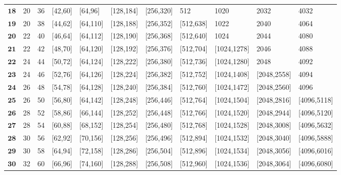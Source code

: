 \begin{sidewaystable}
\begin{tabular}{C{0.8cm}C{1.7cm}C{1.7cm}C{1.7cm}C{1.7cm}C{1.7cm}C{1.7cm}C{1.9cm}C{1.9cm}C{1.8cm}C{1.7cm}}
$\mathbf{18}$ & 20 & 36 & [42,60] & [64,96] & [128,184] & [256,320] & 512 & 1020 & 2032 & 4032 \\
$\mathbf{19}$ & 20 & 38 & [44,62] & [64,110] & [128,188] & [256,352] & [512,638] & 1022 & 2040 & 4064 \\
$\mathbf{20}$ & 22 & 40 & [46,64] & [64,112] & [128,190] & [256,368] & [512,640] & 1024 & 2044 & 4080 \\
$\mathbf{21}$ & 22 & 42 & [48,70] & [64,120] & [128,192] & [256,376] & [512,704] & [1024,1278] & 2046 & 4088 \\
$\mathbf{22}$ & 24 & 44 & [50,72] & [64,124] & [128,222] & [256,380] & [512,736] & [1024,1280] & 2048 & 4092 \\
$\mathbf{23}$ & 24 & 46 & [52,76] & [64,126] & [128,224] & [256,382] & [512,752] & [1024,1408] & [2048,2558] & 4094 \\
$\mathbf{24}$ & 26 & 48 & [54,78] & [64,128] & [128,240] & [256,384] & [512,760] & [1024,1472] & [2048,2560] & 4096 \\
$\mathbf{25}$ & 26 & 50 & [56,80] & [64,142] & [128,248] & [256,446] & [512,764] & [1024,1504] & [2048,2816] & [4096,5118] \\
$\mathbf{26}$ & 28 & 52 & [58,86] & [66,144] & [128,252] & [256,448] & [512,766] & [1024,1520] & [2048,2944] & [4096,5120] \\
$\mathbf{27}$ & 28 & 54 & [60,88] & [68,152] & [128,254] & [256,480] & [512,768] & [1024,1528] & [2048,3008] & [4096,5632] \\
$\mathbf{28}$ & 30 & 56 & [62,92] & [70,156] & [128,256] & [256,496] & [512,894] & [1024,1532] & [2048,3040] & [4096,5888] \\
$\mathbf{29}$ & 30 & 58 & [64,94] & [72,158] & [128,286] & [256,504] & [512,896] & [1024,1534] & [2048,3056] & [4096,6016] \\
$\mathbf{30}$ & 32 & 60 & [66,96] & [74,160] & [128,288] & [256,508] & [512,960] & [1024,1536] & [2048,3064] & [4096,6080] \\
\bottomrule
\end{tabular}
\end{sidewaystable}



